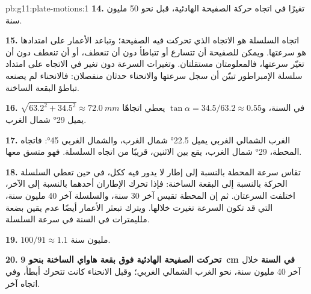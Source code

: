 \begin{solution}{pb:g11:plate-motions:1}
\textbf{14.} تغيرًا في اتجاه حركة الصفيحة الهادئية، قبل نحو
50 مليون سنة.

\textbf{15.} اتجاه السلسلة هو الاتجاه الذي تحركت فيه
الصفيحة؛ وتباعد الأعمار على امتدادها هو سرعتها. ويمكن للصفيحة أن تتسارع أو
تتباطأ دون أن تنعطف، أو أن تنعطف دون أن تغيّر سرعتها، فالمعلومتان
مستقلتان. وتغيرات السرعة دون تغير في الاتجاه على امتداد سلسلة
الإمبراطور تبيّن أن سجل سرعتها والانحناء حدثان منفصلان: فالانحناء
لم يصنعه تباطؤ البقعة الساخنة.

\textbf{16.} $\sqrt{63.2^2 + 34.5^2} \approx \qty{72.0}{mm}$ في السنة،
و$\tan\alpha = 34.5/63.2 \approx 0.55$ يعطي اتجاهًا يميل \ang{29} شمال الغرب.

\textbf{17.} الغرب الشمالي الغربي يميل \ang{22.5} شمال الغرب، والشمال الغربي
\ang{45}: فاتجاه المحطة، \ang{29} شمال الغرب، يقع بين
الاثنين، قريبًا من اتجاه السلسلة. فهو متسق معها.

\textbf{18.} تقاس سرعة المحطة بالنسبة إلى إطار لا يدور فيه
 ككل، في حين تعطي السلسلة
الحركة بالنسبة إلى البقعة الساخنة: فإذا تحرك الإطاران أحدهما بالنسبة إلى
الآخر، اختلفت السرعتان. ثم إن المحطة تقيس آخر 30 سنة،
والسلسلة آخر 40 مليون سنة، التي قد تكون السرعة تغيرت خلالها.
ويترك تبعثر الأعمار أيضًا عدم يقين بضعة ملليمترات في السنة
في سرعة السلسلة.

\textbf{19.} $100/91 \approx 1.1$ مليون سنة.

\textbf{20.} \textbf{تحركت الصفيحة الهادئية فوق بقعة هاواي الساخنة بنحو
\qty{9}{cm} في السنة} خلال آخر 40 مليون سنة، نحو
الغرب الشمالي الغربي؛ وقبل الانحناء كانت تتحرك أبطأ، وفي اتجاه
آخر.
\end{solution}
